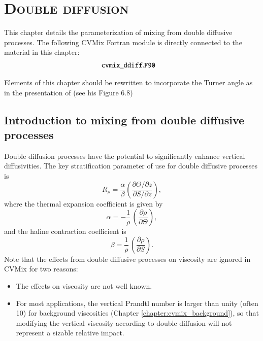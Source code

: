 \chapter{\scshape Double diffusion}
\label{chapter:cvmix_ddiffusion}

\minitoc
\vspace{.5cm}

This chapter details the parameterization of mixing from double
diffusive processes.  The following CVMix Fortran module is directly
connected to the material in this chapter:
\begin{align*} 
 &{\tt cvmix\_ddiff.F90}
\end{align*}

\color{red} Elements of this chapter should be rewritten to
incorporate the Turner angle as in the presentation of
\cite{Large2012} (see his Figure 6.8) \color{black}


\section{Introduction to mixing from double diffusive processes}

Double diffusion processes \citep{Schmitt1994} have the potential to
significantly enhance vertical diffusivities.  The key stratification
parameter of use for double diffusive processes is
\begin{equation}
 R_{\rho} = \frac{\alpha}{\beta} \left( \frac{\partial\Theta/\partial
     z}{\partial S / \partial z} \right),  
\label{eq:stratification-parameter-ddiffuse}
\end{equation}
 where the thermal expansion coefficient is given by 
\begin{equation}
 \alpha = -\frac{1}{\rho} \, \left( \frac{\partial \rho}{\partial  \Theta} \right),
\end{equation}
 and the haline contraction coefficient is 
\begin{equation}
 \beta = \frac{1}{\rho} \, \left( \frac{\partial \rho}{\partial  S} \right).
\end{equation}
Note that the effects from double diffusive processes on viscosity are
ignored in CVMix for two reasons:
\begin{itemize}
 \item The effects on viscosity are not well known.
 \item For most applications, the vertical Prandtl number is larger
   than unity (often 10) for background viscosities (Chapter
   \ref{chapter:cvmix_background}), so that modifying the vertical
   viscosity according to double diffusion will not represent a
   sizable relative impact.
\end{itemize}


